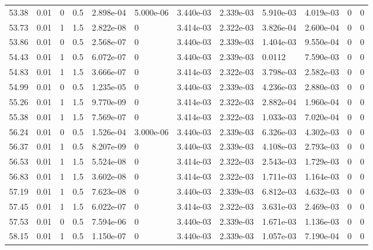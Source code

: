 \documentclass[preview]{standalone}
\begin{document}
{{{{{\begin{tabular}{L{1.2cm}C{1.2cm} C{0.3cm}C{0.5cm} C{1.4cm}C{1.4cm} C{1.4cm}C{1.4cm} C{1.6cm}C{1.6cm} C{1.6cm}C{1.6cm}}
  53.38  &  0.01  & 0     & 0.5 &  2.898e-04  & 5.000e-06  &  3.440e-03&   2.339e-03& 5.910e-03 & 4.019e-03   &  0 & 0  \\ 
  53.73  &  0.01  & 1     & 1.5 &  2.822e-08  & 0  &  3.414e-03&   2.322e-03& 3.826e-04 & 2.600e-04   &  0 & 0  \\ 
  53.86  &  0.01  & 0     & 0.5 &  2.568e-07  & 0  &  3.440e-03&   2.339e-03& 1.404e-03 & 9.550e-04   &  0 & 0  \\ 
  54.43  &  0.01  & 1     & 0.5 &  6.072e-07  & 0  &  3.440e-03&   2.339e-03& 0.0112 & 7.590e-03   &  0 & 0  \\ 
  54.83  &  0.01  & 1     & 1.5 &  3.666e-07  & 0  &  3.414e-03&   2.322e-03& 3.798e-03 & 2.582e-03   &  0 & 0  \\ 
  54.99  &  0.01  & 0     & 0.5 &  1.235e-05  & 0  &  3.440e-03&   2.339e-03& 4.236e-03 & 2.880e-03   &  0 & 0  \\ 
  55.26  &  0.01  & 1     & 1.5 &  9.770e-09  & 0  &  3.414e-03&   2.322e-03& 2.882e-04 & 1.960e-04   &  0 & 0  \\ 
  55.38  &  0.01  & 1     & 1.5 &  7.569e-07  & 0  &  3.414e-03&   2.322e-03& 1.033e-03 & 7.020e-04   &  0 & 0  \\ 
  56.24  &  0.01  & 0     & 0.5 &  1.526e-04  & 3.000e-06  &  3.440e-03&   2.339e-03& 6.326e-03 & 4.302e-03   &  0 & 0  \\ 
  56.37  &  0.01  & 1     & 0.5 &  8.207e-09  & 0  &  3.440e-03&   2.339e-03& 4.108e-03 & 2.793e-03   &  0 & 0  \\ 
  56.53  &  0.01  & 1     & 1.5 &  5.524e-08  & 0  &  3.414e-03&   2.322e-03& 2.543e-03 & 1.729e-03   &  0 & 0  \\ 
  56.83  &  0.01  & 1     & 1.5 &  3.602e-08  & 0  &  3.414e-03&   2.322e-03& 1.711e-03 & 1.164e-03   &  0 & 0  \\ 
  57.19  &  0.01  & 1     & 0.5 &  7.623e-08  & 0  &  3.440e-03&   2.339e-03& 6.812e-03 & 4.632e-03   &  0 & 0  \\ 
  57.45  &  0.01  & 1     & 1.5 &  6.022e-07  & 0  &  3.414e-03&   2.322e-03& 3.631e-03 & 2.469e-03   &  0 & 0  \\ 
  57.53  &  0.01  & 0     & 0.5 &  7.594e-06  & 0  &  3.440e-03&   2.339e-03& 1.671e-03 & 1.136e-03   &  0 & 0  \\ 
  58.15  &  0.01  & 1     & 0.5 &  1.150e-07  & 0  &  3.440e-03&   2.339e-03& 1.057e-03 & 7.190e-04   &  0 & 0  \\ 
\hline 
\end{tabular} 

}}}}}
\end{document}
